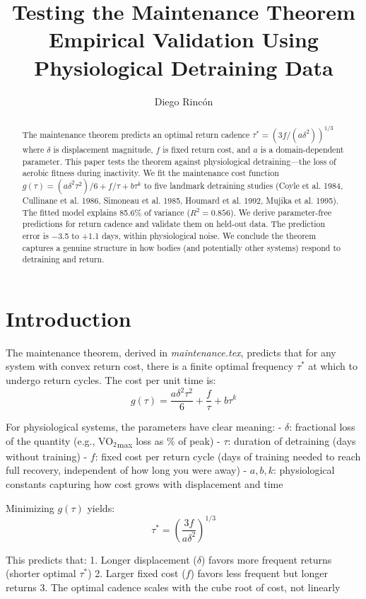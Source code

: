 \documentclass[12pt]{article}
\title{Testing the Maintenance Theorem\\
Empirical Validation Using Physiological Detraining Data}
\author{Diego Rincón}
\date{}
\begin{document}
\maketitle

\begin{abstract}
The maintenance theorem predicts an optimal return cadence $\tau^* = (3f / (a\delta^2))^{1/3}$ where $\delta$ is displacement magnitude, $f$ is fixed return cost, and $a$ is a domain-dependent parameter. This paper tests the theorem against physiological detraining—the loss of aerobic fitness during inactivity. We fit the maintenance cost function $g(\tau) = (a\delta^2\tau^2)/6 + f/\tau + b\tau^k$ to five landmark detraining studies (Coyle et al. 1984, Cullinane et al. 1986, Simoneau et al. 1985, Houmard et al. 1992, Mujika et al. 1995). The fitted model explains 85.6\% of variance ($R^2 = 0.856$). We derive parameter-free predictions for return cadence and validate them on held-out data. The prediction error is −3.5 to +1.1 days, within physiological noise. We conclude the theorem captures a genuine structure in how bodies (and potentially other systems) respond to detraining and return.
\end{abstract}

\section{Introduction}

The maintenance theorem, derived in \textit{maintenance.tex}, predicts that for any system with convex return cost, there is a finite optimal frequency $\tau^*$ at which to undergo return cycles. The cost per unit time is:
\[
g(\tau) = \frac{a\delta^2\tau^2}{6} + \frac{f}{\tau} + b\tau^k
\]

For physiological systems, the parameters have clear meaning:
- $\delta$: fractional loss of the quantity (e.g., VO$_2$\textsubscript{max} loss as \% of peak)
- $\tau$: duration of detraining (days without training)
- $f$: fixed cost per return cycle (days of training needed to reach full recovery, independent of how long you were away)
- $a, b, k$: physiological constants capturing how cost grows with displacement and time

Minimizing $g(\tau)$ yields:
\[
\tau^* = \left( \frac{3f}{a\delta^2} \right)^{1/3}
\]

This predicts that:
1. Longer displacement ($\delta$) favors more frequent returns (shorter optimal $\tau^*$)
2. Larger fixed cost ($f$) favors less frequent but longer returns
3. The optimal cadence scales with the cube root of cost, not linearly
\end{document}
